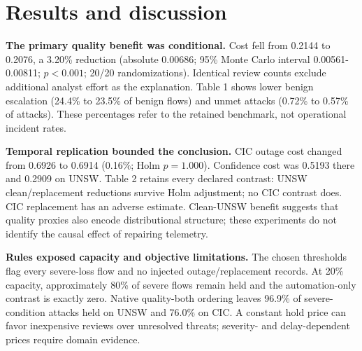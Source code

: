 \documentclass[11pt,letterpaper]{article}
\begin{document}
\section{Results and discussion}
\textbf{The primary quality benefit was conditional.} Cost fell from 0.2144 to 0.2076, a 3.20\% reduction (absolute 0.00686; 95\% Monte Carlo interval 0.00561-0.00811; \(p<0.001\); 20/20 randomizations). Identical review counts exclude additional analyst effort as the explanation. Table 1 shows lower benign escalation (24.4\% to 23.5\% of benign flows) and unmet attacks (0.72\% to 0.57\% of attacks). These percentages refer to the retained benchmark, not operational incident rates.

\begin{table}[!ht]\centering\caption{Outage results at 20\% review capacity, averaged over randomizations and reviewers. Close and Unmet are percentages of all attacks. Conformal adaptation adds band restrictions; other methods share matched counts. Other metrics are in the saved outputs. Means are descriptive.}\small\singlespacing\renewcommand{\arraystretch}{2}\CyberTableOne\label{tab:1}\end{table}
\textbf{Temporal replication bounded the conclusion.} CIC outage cost changed from 0.6926 to 0.6914 (0.16\%; Holm \(p=1.000\)). Confidence cost was 0.5193 there and 0.2909 on UNSW. Table 2 retains every declared contrast: UNSW clean/replacement reductions survive Holm adjustment; no CIC contrast does. CIC replacement has an adverse estimate. Clean-UNSW benefit suggests that quality proxies also encode distributional structure; these experiments do not identify the causal effect of repairing telemetry.

\begin{table}[!ht]\centering\caption{Quality-in-automation versus probability-only cost at 20\% capacity. Positive differences favor quality. * denotes the primary; Holm covers the other seven rows. MC intervals describe randomizations on fixed corpora. Severe-condition zeros are structural.}\small\singlespacing\renewcommand{\arraystretch}{2}\CyberTableTwo\label{tab:2}\end{table}
\textbf{Rules exposed capacity and objective limitations.} The chosen thresholds flag every severe-loss flow and no injected outage/replacement records. At 20\% capacity, approximately 80\% of severe flows remain held and the automation-only contrast is exactly zero. Native quality-both ordering leaves 96.9\% of severe-condition attacks held on UNSW and 76.0\% on CIC. A constant hold price can favor inexpensive reviews over unresolved threats; severity- and delay-dependent prices require domain evidence.
\end{document}
